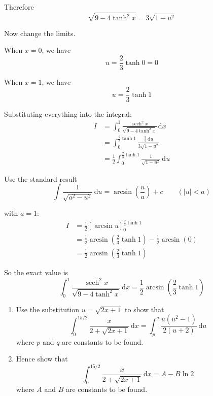 \documentclass[leqno]{article}
\begin{document}
\begin{enumerate}[
  label=\textbf{\arabic*.},
  leftmargin=*,
  topsep=0pt,
  partopsep=0pt,
  parsep=0pt
]
\begin{djsSolution}
Therefore
\[
\sqrt{9-4\tanh^2 x}=3\sqrt{1-u^2}
\]

Now change the limits.

When \(x=0\), we have
\[
u=\frac{2}{3}\tanh 0=0
\]

When \(x=1\), we have
\[
u=\frac{2}{3}\tanh 1
\]

Substituting everything into the integral:
\begin{align*}
I
&=\int_0^1 \frac{\operatorname{sech}^2 x}{\sqrt{9-4\tanh^2 x}}\,\mathrm{d}x \\
&=\int_0^{\frac{2}{3}\tanh 1} \frac{\frac{3}{2}\,\mathrm{d}u}{3\sqrt{1-u^2}} \\
&=\frac{1}{2}\int_0^{\frac{2}{3}\tanh 1}\frac{1}{\sqrt{1-u^2}}\,\mathrm{d}u
\end{align*}

Use the standard result
\[
\int \frac{1}{\sqrt{a^2-u^2}}\,\mathrm{d}u=\arcsin\left(\frac{u}{a}\right)+c\qquad (|u|<a)
\]

with \(a=1\):
\begin{align*}
I
&=\frac{1}{2}\left[\arcsin u\right]_0^{\frac{2}{3}\tanh 1} \\
&=\frac{1}{2}\arcsin\left(\frac{2}{3}\tanh 1\right)-\frac{1}{2}\arcsin(0) \\
&=\frac{1}{2}\arcsin\left(\frac{2}{3}\tanh 1\right)
\end{align*}

So the exact value is
\[
\int_0^1 \frac{\operatorname{sech}^2 x}{\sqrt{9-4\tanh^2 x}}\,\mathrm{d}x
=\frac{1}{2}\arcsin\left(\frac{2}{3}\tanh 1\right)
\]
\end{djsSolution}


\newpage

\questionitem

\begin{enumerate}[label=\textbf{(\alph*)}]
  \item Use the substitution $u=\sqrt{2x+1}$ to show that
  \[
  \int_0^{15/2} \frac{x}{2+\sqrt{2x+1}}\,\mathrm{d}x = \int_p^q \frac{u(u^2-1)}{2(u+2)}\,\mathrm{d}u
  \]
  where $p$ and $q$ are constants to be found.
   \\
  \item Hence show that
  \[
  \int_0^{15/2} \frac{x}{2+\sqrt{2x+1}}\,\mathrm{d}x = A - B\ln 2
  \]
  where $A$ and $B$ are constants to be found.
\end{enumerate}

\vspace*{10pt}


\end{enumerate}
\end{document}

